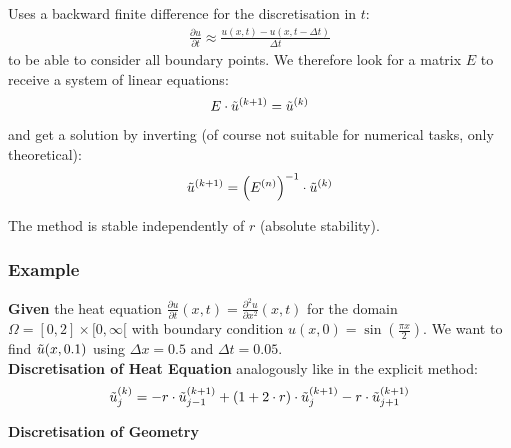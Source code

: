 
Uses a backward finite difference for the discretisation in $t$:
\begin{align*}
	\frac{\partial u}{\partial t} \approx \frac{u(x,t) - u(x, t-\Delta t)}{\Delta t}
\end{align*}
to be able to consider all boundary points.
We therefore look for a matrix $E$ to receive a system of linear equations:
\begin{align*}
	E\cdot \tilde{u}^{(k+1)} = \tilde{u}^{(k)}
\end{align*}
and get a solution by inverting (of course not suitable for numerical tasks, only theoretical):
\begin{align*}
	\tilde{u}^{(k+1)} = \left(E^{(n)}\right)^{-1}\cdot\tilde{u}^{(k)}
\end{align*}

The method is stable independently of $r$ (absolute stability).

\subsubsection{Example}

\textbf{Given} the heat equation $\frac{\partial u}{\partial t}(x,t) = \frac{\partial^2 u}{\partial x^2}(x,t)$
for the domain $\Omega = [0,2]\times [0, \infty[$ with boundary condition
$u(x,0) = \sin\left(\frac{\pi x}{2}\right)$. We want to find $\tilde{u}(x,0.1)$ using $\Delta x = 0.5$ and $\Delta t = 0.05$.
\\[1em]
\textbf{Discretisation of Heat Equation}
analogously like in the explicit method:
\begin{align*}
	\tilde{u}_{j}^{(k)}=-r\cdot\tilde{u}_{j-1}^{(k+1)}+(1+2\cdot r)\cdot\tilde{u}_{j}^{(k+1)}-r\cdot\tilde{u}_{j+1}^{(k+1)}
\end{align*}

\textbf{Discretisation of Geometry}


